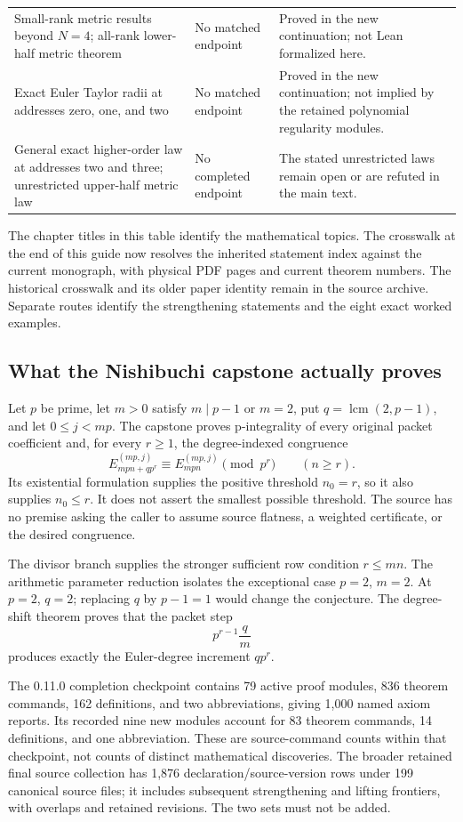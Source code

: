 \begin{longtable}{p{.32\linewidth}p{.30\linewidth}p{.29\linewidth}}
Small-rank metric results beyond $N=4$; all-rank lower-half metric theorem & No matched endpoint & Proved in the new continuation; not Lean formalized here.\\
Exact Euler Taylor radii at addresses zero, one, and two & No matched endpoint & Proved in the new continuation; not implied by the retained polynomial regularity modules.\\
General exact higher-order law at addresses two and three; unrestricted upper-half metric law & No completed endpoint & The stated unrestricted laws remain open or are refuted in the main text.\\
\bottomrule\end{longtable}

The chapter titles in this table identify the mathematical topics. The crosswalk at the end of this guide now resolves the inherited statement index against the current monograph, with physical PDF pages and current theorem numbers. The historical crosswalk and its older paper identity remain in the source archive. Separate routes identify the strengthening statements and the eight exact worked examples.

\subsection{What the Nishibuchi capstone actually proves}
Let $p$ be prime, let $m>0$ satisfy $m\mid p-1$ or $m=2$, put $q=\operatorname{lcm}(2,p-1)$, and let $0\le j<mp$. The capstone proves p-integrality of every original packet coefficient and, for every $r\ge1$, the degree-indexed congruence
\[
 E_{mpn+qp^r}^{(mp,j)}\equiv E_{mpn}^{(mp,j)}\pmod{p^r}
 \qquad(n\ge r).
\]
Its existential formulation supplies the positive threshold $n_0=r$, so it also supplies $n_0\le r$. It does not assert the smallest possible threshold. The source has no premise asking the caller to assume source flatness, a weighted certificate, or the desired congruence.

The divisor branch supplies the stronger sufficient row condition $r\le mn$. The arithmetic parameter reduction isolates the exceptional case $p=2$, $m=2$. At $p=2$, $q=2$; replacing $q$ by $p-1=1$ would change the conjecture. The degree-shift theorem proves that the packet step
\[
 p^{r-1}\frac{q}{m}
\]
produces exactly the Euler-degree increment $qp^r$.

The 0.11.0 completion checkpoint contains 79 active proof modules, 836 theorem commands, 162 definitions, and two abbreviations, giving 1,000 named axiom reports. Its recorded nine new modules account for 83 theorem commands, 14 definitions, and one abbreviation. These are source-command counts within that checkpoint, not counts of distinct mathematical discoveries. The broader retained final source collection has 1,876 declaration/source-version rows under 199 canonical source files; it includes subsequent strengthening and lifting frontiers, with overlaps and retained revisions. The two sets must not be added.

